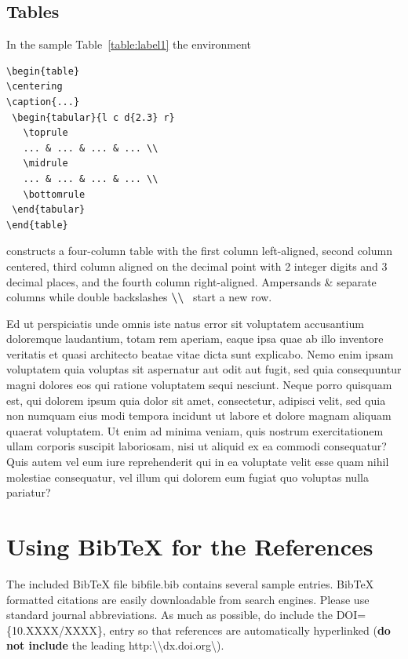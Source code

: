 \documentclass[10pt,a4paper,twoside]{article}
\begin{document}
\subsection{Tables}
In the sample Table~\ref{table:label1} the environment
\begin{verbatim} 
\begin{table}
\centering 
\caption{...}
 \begin{tabular}{l c d{2.3} r}
   \toprule
   ... & ... & ... & ... \\
   \midrule
   ... & ... & ... & ... \\
   \bottomrule
 \end{tabular}
\end{table}
\end{verbatim} 
constructs a four-column table with the first column left-aligned, second column centered, third column aligned on the decimal point with 2 integer digits and 3 decimal places, and the fourth column right-aligned. Ampersands {\ttfamily \&} separate columns while double backslashes \textbf{\textbackslash\textbackslash} \ start a new row.

Ed ut perspiciatis unde omnis iste natus error sit voluptatem accusantium doloremque laudantium, totam rem aperiam, eaque ipsa quae ab illo inventore veritatis et quasi architecto beatae vitae dicta sunt explicabo. Nemo enim ipsam voluptatem quia voluptas sit aspernatur aut odit aut fugit, sed quia consequuntur magni dolores eos qui ratione voluptatem sequi nesciunt. Neque porro quisquam est, qui dolorem ipsum quia dolor sit amet, consectetur, adipisci velit, sed quia non numquam eius modi tempora incidunt ut labore et dolore magnam aliquam quaerat voluptatem. Ut enim ad minima veniam, quis nostrum exercitationem ullam corporis suscipit laboriosam, nisi ut aliquid ex ea commodi consequatur? Quis autem vel eum iure reprehenderit qui in ea voluptate velit esse quam nihil molestiae consequatur, vel illum qui dolorem eum fugiat quo voluptas nulla pariatur?

\section{Using BibTeX for the References}
The included BibTeX file {\ttfamily bibfile}.{\ttfamily bib} contains several sample entries. BibTeX formatted citations are easily downloadable from search engines. Please use standard journal abbreviations. As much as possible, do include the {\ttfamily DOI}=\{{\ttfamily 10.XXXX}/{\ttfamily XXXX}\}{\ttfamily ,} entry so that references are automatically hyperlinked (\textbf{do not include} the leading {\ttfamily http}:\textbackslash\textbackslash{\ttfamily dx.doi.org}\textbackslash).
\end{document}
